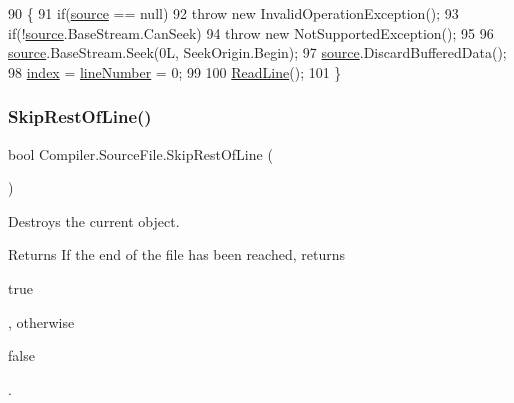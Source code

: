 \begin{DoxyCode}
90                                         \{
91                         \textcolor{keywordflow}{if}(\mbox{\hyperlink{class_compiler_1_1_source_file_a46db9fe024d4cf1e282e6afafea8c4b2}{source}} == null)
92                             \textcolor{keywordflow}{throw} \textcolor{keyword}{new} InvalidOperationException();
93                         \textcolor{keywordflow}{if}(!\mbox{\hyperlink{class_compiler_1_1_source_file_a46db9fe024d4cf1e282e6afafea8c4b2}{source}}.BaseStream.CanSeek)
94                             \textcolor{keywordflow}{throw} \textcolor{keyword}{new} NotSupportedException();
95 
96                         \mbox{\hyperlink{class_compiler_1_1_source_file_a46db9fe024d4cf1e282e6afafea8c4b2}{source}}.BaseStream.Seek(0L, SeekOrigin.Begin);
97                         \mbox{\hyperlink{class_compiler_1_1_source_file_a46db9fe024d4cf1e282e6afafea8c4b2}{source}}.DiscardBufferedData();
98                         \mbox{\hyperlink{class_compiler_1_1_source_file_a46a2996b918f0b2f795449879663cfe5}{index}} = \mbox{\hyperlink{class_compiler_1_1_source_file_a9fea4fc4a3640f2f88db7d2e8be3db70}{lineNumber}} = 0;
99 
100                         \mbox{\hyperlink{class_compiler_1_1_source_file_a4e9f67bce62e15431b753705a79097ad}{ReadLine}}();
101                     \}
\end{DoxyCode}
\mbox{\label{class_compiler_1_1_source_file_a236483cd300f9793eed183d32959c7bd}} 
\subsubsection{\texorpdfstring{Skip\+Rest\+Of\+Line()}{SkipRestOfLine()}}
{\footnotesize\ttfamily bool Compiler.\+Source\+File.\+Skip\+Rest\+Of\+Line (\begin{DoxyParamCaption}{ }\end{DoxyParamCaption})}

Destroys the current object. \begin{DoxyReturn}{Returns}
If the end of the file has been reached, returns
\begin{DoxyCode}
\textcolor{keyword}{true} 
\end{DoxyCode}
 , otherwise
\begin{DoxyCode}
\textcolor{keyword}{false} 
\end{DoxyCode}
 . 
\end{DoxyReturn}

